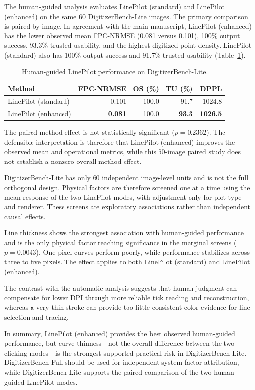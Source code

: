\documentclass{article}
\begin{document}
The human-guided analysis evaluates LinePilot (standard) and LinePilot (enhanced) on the same 60 DigitizerBench-Lite images. The primary comparison is paired by image. In agreement with the main manuscript, LinePilot (enhanced) has the lower observed mean FPC-NRMSE (0.081 versus 0.101), 100\% output success, 93.3\% trusted usability, and the highest digitized-point density. LinePilot (standard) also has 100\% output success and 91.7\% trusted usability (Table~\ref{tab:human-summary}).

\begin{table}[t]
\centering\small
\caption{Human-guided LinePilot performance on DigitizerBench-Lite.}
\label{tab:human-summary}
\setlength{\tabcolsep}{3pt}
\begin{tabular}{@{}lrrrr@{}}
\toprule
Method & FPC-NRMSE & OS (\%) & TU (\%) & DPPL \\
\midrule
LinePilot (standard) & 0.101 & 100.0 & 91.7 & 1024.8 \\
LinePilot (enhanced) & \textbf{0.081} & 100.0 & \textbf{93.3} & \textbf{1026.5} \\
\bottomrule
\end{tabular}
\end{table}

The paired method effect is not statistically significant ($p=0.2362$). The defensible interpretation is therefore that LinePilot (enhanced) improves the observed mean and operational metrics, while this 60-image paired study does not establish a nonzero overall method effect.

DigitizerBench-Lite has only 60 independent image-level units and is not the full orthogonal design. Physical factors are therefore screened one at a time using the mean response of the two LinePilot modes, with adjustment only for plot type and renderer. These screens are exploratory associations rather than independent causal effects.

Line thickness shows the strongest association with human-guided performance and is the only physical factor reaching significance in the marginal screens ($p=0.0043$). One-pixel curves perform poorly, while performance stabilizes across three to five pixels. The effect applies to both LinePilot (standard) and LinePilot (enhanced).

The contrast with the automatic analysis suggests that human judgment can compensate for lower DPI through more reliable tick reading and reconstruction, whereas a very thin stroke can provide too little consistent color evidence for line selection and tracing.

In summary, LinePilot (enhanced) provides the best observed human-guided performance, but curve thinness---not the overall difference between the two clicking modes---is the strongest supported practical risk in DigitizerBench-Lite. DigitizerBench-Full should be used for independent system-factor attribution, while DigitizerBench-Lite supports the paired comparison of the two human-guided LinePilot modes.



\end{document}
